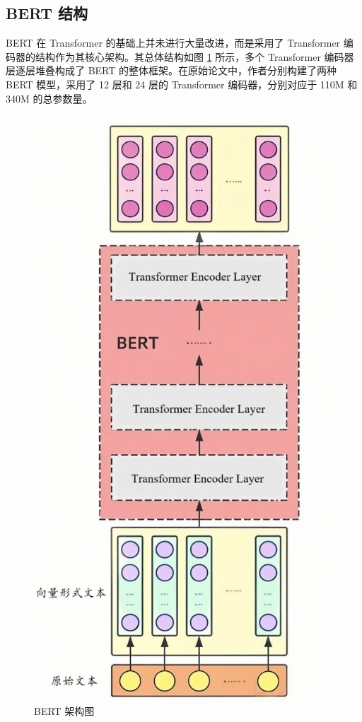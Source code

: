 \subsection{BERT 结构}

BERT 在 Transformer 的基础上并未进行大量改进，而是采用了 Transformer 编码器的结构作为其核心架构。其总体结构如图 \ref{fig:BERT} 所示，多个 Transformer 编码器层逐层堆叠构成了 BERT 的整体框架。在原始论文中，作者分别构建了两种 BERT 模型，采用了 12 层和 24 层的 Transformer 编码器，分别对应于 110M 和 340M 的总参数量。

\begin{figure}[htb]
	\centering
	\includegraphics[scale = 0.5]{figures/bert.png}
	\caption{BERT 架构图 \cite{devlin_bert_2019}}
	\label{fig:BERT}
\end{figure}

